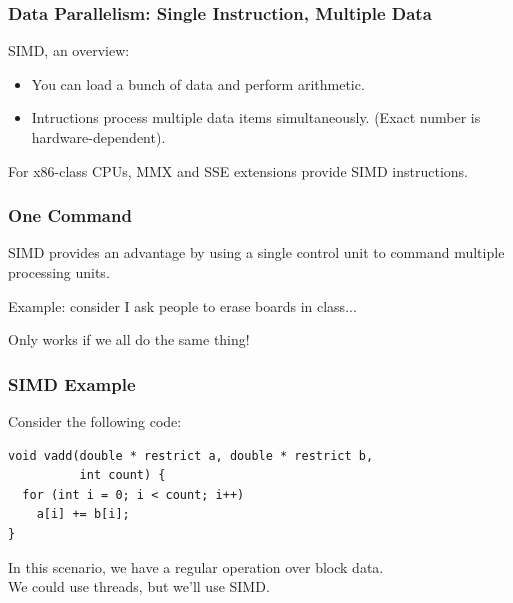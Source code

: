 \begin{frame}
  \frametitle{Data Parallelism: Single Instruction, Multiple Data}

  
   SIMD, an overview:
    \begin{itemize}
    \item You can load a bunch of data and perform 
      arithmetic.
    \item Intructions process multiple data items simultaneously.
      (Exact number is hardware-dependent).
    \end{itemize}
    For x86-class CPUs, MMX and SSE extensions provide SIMD instructions.
  
\end{frame}


\begin{frame}
\frametitle{One Command}

SIMD provides an advantage by using a single control unit to command multiple processing units.


Example: consider I ask people to erase boards in class...

Only works if we all do the same thing!

\end{frame}


\begin{frame}[fragile]
  \frametitle{SIMD Example}

  
  Consider the following code:

  \begin{lstlisting}
void vadd(double * restrict a, double * restrict b, 
          int count) {
  for (int i = 0; i < count; i++)
    a[i] += b[i];
}    
  \end{lstlisting}

    In this scenario, we have a regular operation over block data.\\[1em]

    We could use threads, but we'll use SIMD.

  
\end{frame}

